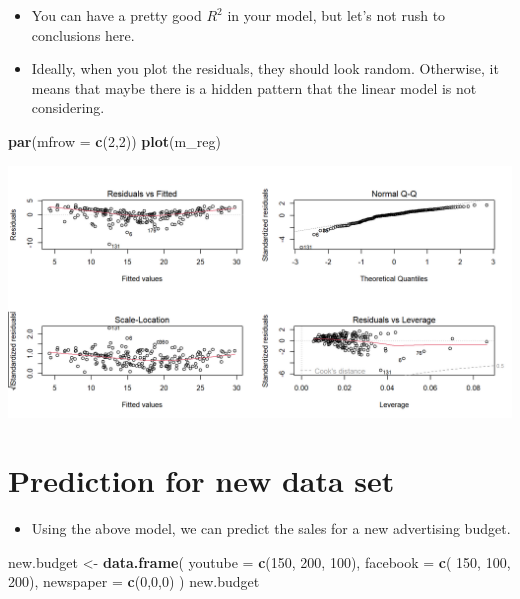 \documentclass[
]{book}
\newenvironment{Shaded}{\begin{snugshade}}{\end{snugshade}}
\newcommand{\AttributeTok}[1]{\textcolor[rgb]{0.13,0.29,0.53}{#1}}
\newcommand{\DecValTok}[1]{\textcolor[rgb]{0.00,0.00,0.81}{#1}}
\newcommand{\FunctionTok}[1]{\textcolor[rgb]{0.13,0.29,0.53}{\textbf{#1}}}
\newcommand{\NormalTok}[1]{#1}
\newcommand{\OtherTok}[1]{\textcolor[rgb]{0.56,0.35,0.01}{#1}}
\providecommand{\tightlist}{%
  \setlength{\itemsep}{0pt}\setlength{\parskip}{0pt}}
\begin{document}
\begin{itemize}
\item
  You can have a pretty good \(R^2\) in your model, but let's not rush to conclusions here.
\item
  Ideally, when you plot the residuals, they should look random. Otherwise, it means that maybe there is a hidden pattern that the linear model is not considering.
\end{itemize}

\begin{Shaded}
\begin{Highlighting}[]
\FunctionTok{par}\NormalTok{(}\AttributeTok{mfrow =} \FunctionTok{c}\NormalTok{(}\DecValTok{2}\NormalTok{,}\DecValTok{2}\NormalTok{))}
\FunctionTok{plot}\NormalTok{(m\_reg)}
\end{Highlighting}
\end{Shaded}

\begin{center}\includegraphics{figure/unnamed-chunk-31-1} \end{center}

\hypertarget{prediction-for-new-data-set}{%
\section{Prediction for new data set}\label{prediction-for-new-data-set}}

\begin{itemize}
\tightlist
\item
  Using the above model, we can predict the sales for a new advertising budget.
\end{itemize}

\begin{Shaded}
\begin{Highlighting}[]
\NormalTok{new.budget }\OtherTok{\textless{}{-}} \FunctionTok{data.frame}\NormalTok{(}
  \AttributeTok{youtube =} \FunctionTok{c}\NormalTok{(}\DecValTok{150}\NormalTok{, }\DecValTok{200}\NormalTok{, }\DecValTok{100}\NormalTok{),}
  \AttributeTok{facebook =} \FunctionTok{c}\NormalTok{( }\DecValTok{150}\NormalTok{, }\DecValTok{100}\NormalTok{, }\DecValTok{200}\NormalTok{),}
  \AttributeTok{newspaper =} \FunctionTok{c}\NormalTok{(}\DecValTok{0}\NormalTok{,}\DecValTok{0}\NormalTok{,}\DecValTok{0}\NormalTok{)}
\NormalTok{)}
\NormalTok{new.budget}
\end{Highlighting}
\end{Shaded}
\end{document}
